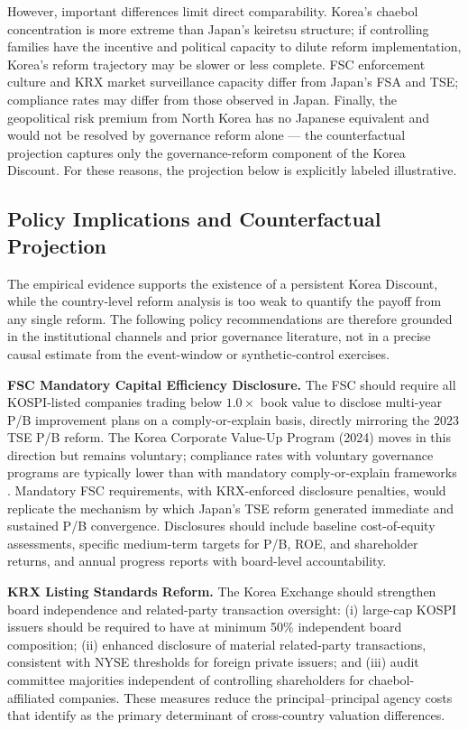 \documentclass[12pt]{article}
\begin{document}
However, important differences limit direct comparability. Korea's chaebol concentration is
more extreme than Japan's keiretsu structure; if controlling families have the incentive and
political capacity to dilute reform implementation, Korea's reform trajectory may be slower
or less complete. FSC enforcement culture and KRX market surveillance capacity differ from
Japan's FSA and TSE; compliance rates may differ from those observed in Japan. Finally, the
geopolitical risk premium from North Korea has no Japanese equivalent and would not be
resolved by governance reform alone --- the counterfactual projection captures only the
governance-reform component of the Korea Discount. For these reasons, the projection below
is explicitly labeled illustrative.

\subsection{Policy Implications and Counterfactual Projection}
\label{sec:policy_implications}

The empirical evidence supports the existence of a persistent Korea Discount, while the
country-level reform analysis is too weak to quantify the payoff from any single reform. The
following policy recommendations are therefore grounded in the institutional channels and
prior governance literature, not in a precise causal estimate from the event-window or
synthetic-control exercises.

\textbf{FSC Mandatory Capital Efficiency Disclosure.} The FSC should require all KOSPI-listed
companies trading below $1.0\times$ book value to disclose multi-year P/B improvement plans
on a comply-or-explain basis, directly mirroring the 2023 TSE P/B reform. The Korea Corporate
Value-Up Program (2024) moves in this direction but remains voluntary; compliance rates with
voluntary governance programs are typically lower than with mandatory comply-or-explain
frameworks \citep{kcmi2023}. Mandatory FSC requirements, with KRX-enforced disclosure
penalties, would replicate the mechanism by which Japan's TSE reform generated immediate and
sustained P/B convergence. Disclosures should include baseline cost-of-equity assessments,
specific medium-term targets for P/B, ROE, and shareholder returns, and annual progress
reports with board-level accountability.

\textbf{KRX Listing Standards Reform.} The Korea Exchange should strengthen board independence
and related-party transaction oversight: (i) large-cap KOSPI issuers should be required to
have at minimum 50\% independent board composition; (ii) enhanced disclosure of material
related-party transactions, consistent with NYSE thresholds for foreign private issuers; and
(iii) audit committee majorities independent of controlling shareholders for chaebol-affiliated
companies. These measures reduce the principal--principal agency costs that \citet{porta1998,
porta2002} identify as the primary determinant of cross-country valuation differences.
\end{document}
